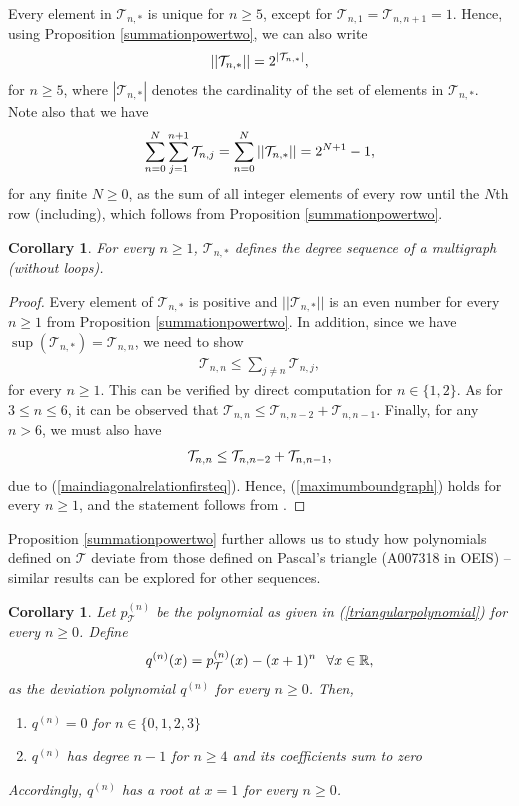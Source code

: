 \documentclass[a4paper,12pt]{article}
\newtheorem{coro}[thm]{Corollary}
\def\R{\mathbb{R}}
\def\T{\mathcal{T}}
\begin{document}
Every element in $\T_{n,*}$ is unique for $n\geq 5$, except for $\T_{n,1} = \T_{n,n+1} = 1$. Hence, using Proposition \ref{summationpowertwo}, we can also write 
\begin{align}
||\T_{n,*}|| = 2^{|\T_{n,*}|}, \notag
\end{align} 
for $n\geq 5$, where $|\T_{n,*}|$ denotes the cardinality of the set of elements in $\T_{n,*}$. Note also that we have
\begin{align}
\sum_{n=0}^N\sum_{j=1}^{n+1} \T_{n,j} = \sum_{n=0}^N ||\T_{n,*}|| = 2^{N+1} - 1, \notag
\end{align}
for any finite $N\geq 0$, as the sum of all integer elements of every row until the $N$th row (including), which follows from Proposition \ref{summationpowertwo}.
\begin{coro}
For every $n\geq 1$, $\T_{n,*}$ defines the degree sequence of a multigraph (without loops).
\end{coro}
\begin{proof}
Every element of $\T_{n,*}$ is positive and $||\T_{n,*}||$ is an even number for every $n\geq 1$ from Proposition \ref{summationpowertwo}. In addition, since we have $\sup(\T_{n,*}) = \T_{n,n}$, we need to show
\begin{align}
\T_{n,n} \leq \sum_{j\neq n} \T_{n,j}, \label{maximumboundgraph}
\end{align}
for every $n\geq 1$. This can be verified by direct computation for $n\in\{1,2\}$. As for $3 \leq n \leq 6$, it can be observed that $\T_{n,n} \leq \T_{n,n-2} + \T_{n,n-1}$. Finally, for any $n>6$, we must also have 
\begin{align}
\T_{n,n} \leq \T_{n,n-2} + \T_{n,n-1}, \notag 
\end{align}
due to (\ref{maindiagonalrelationfirsteq}). Hence, (\ref{maximumboundgraph}) holds for every $n\geq 1$, and the statement follows from \cite{graphone}.
\end{proof}
Proposition \ref{summationpowertwo} further allows us to study how polynomials defined on $\T$ deviate from those defined on Pascal's triangle (A007318 in OEIS) -- similar results can be explored for other sequences.
\begin{coro}
\label{polynomialcorollary}
Let $p^{(n)}_{\T}$ be the polynomial as given in (\ref{triangularpolynomial}) for every $n\geq 0$. Define 
\begin{align}
q^{(n)}(x) = p^{(n)}_{\T}(x) - (x+1)^n \hspace{0.1in} \forall x \in \R, \notag
\end{align}
as the deviation polynomial $q^{(n)}$ for every $n\geq 0$. Then, 
\begin{enumerate}
\item $q^{(n)} = 0$ for $n\in\{0,1,2,3\}$
\item $q^{(n)}$ has degree $n-1$ for $n\geq4$ and its coefficients sum to zero
\end{enumerate}
Accordingly, $q^{(n)}$ has a root at $x=1$ for every $n\geq 0$.
\end{coro}
\end{document}
